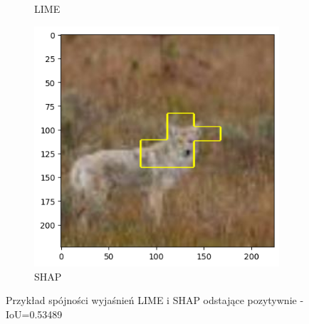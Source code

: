 \begin{figure}[h]
\begin{subfigure}[b]{0.3\textwidth}
		\caption{LIME}  \label{}
	\end{subfigure}
	\begin{subfigure}[b]{0.3\textwidth}
		\centering\includegraphics[width=.9\textwidth]{img/examples/appendix/n02114855_39555_shap}
		\caption{SHAP}
	\end{subfigure}
	\caption{Przykład spójności wyjaśnień LIME i SHAP odstające pozytywnie - IoU=0.53489}
	\label{}
\end{figure}

